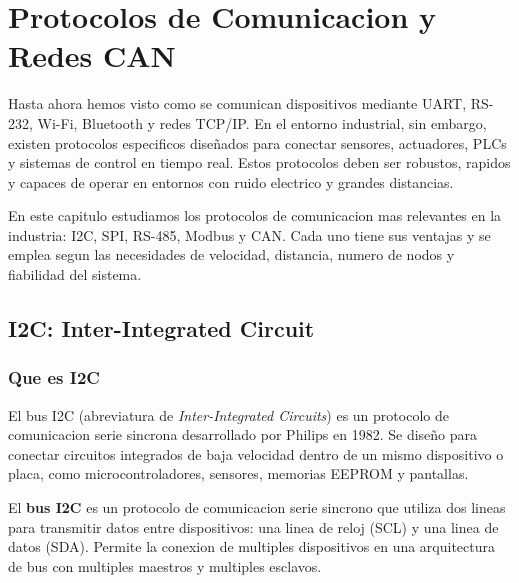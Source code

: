 
\chapter{Protocolos de Comunicacion y Redes CAN}

Hasta ahora hemos visto como se comunican dispositivos mediante UART, RS-232,
Wi-Fi, Bluetooth y redes TCP/IP. En el entorno industrial, sin embargo, existen
protocolos especificos diseñados para conectar sensores, actuadores, PLCs y
sistemas de control en tiempo real. Estos protocolos deben ser robustos, rapidos
y capaces de operar en entornos con ruido electrico y grandes distancias.

En este capitulo estudiamos los protocolos de comunicacion mas relevantes en
la industria: I2C, SPI, RS-485, Modbus y CAN. Cada uno tiene sus ventajas y
se emplea segun las necesidades de velocidad, distancia, numero de nodos y
fiabilidad del sistema.


\section{I2C: Inter-Integrated Circuit}

\subsection{Que es I2C}

El bus I2C (abreviatura de \textit{Inter-Integrated Circuits}) es un protocolo de
comunicacion serie sincrona desarrollado por Philips en 1982. Se diseño para
conectar circuitos integrados de baja velocidad dentro de un mismo dispositivo
o placa, como microcontroladores, sensores, memorias EEPROM y pantallas.

\begin{definicion}[I2C]
El \textbf{bus I2C} es un protocolo de comunicacion serie sincrono que utiliza
dos lineas para transmitir datos entre dispositivos: una linea de reloj (SCL) y
una linea de datos (SDA). Permite la conexion de multiples dispositivos en una
arquitectura de bus con multiples maestros y multiples esclavos.
\end{definicion}

